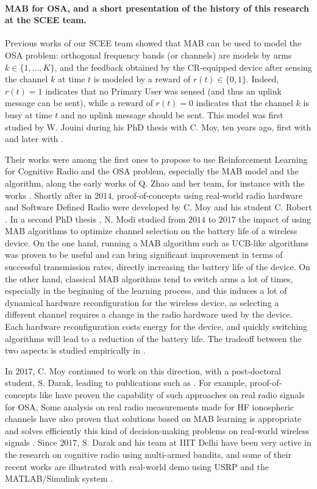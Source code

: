 \paragraph{MAB for OSA, and a short presentation of the history of this research at the SCEE team.}
%
Previous works of our SCEE team showed that MAB can be used to model the OSA problem:
orthogonal frequency bands (or channels) are models by arms $k\in\{1,\dots,K\}$,
and the feedback obtained by the CR-equipped device after sensing the channel $k$ at time $t$ is modeled by a reward of $r(t) \in \{0,1\}$.
Indeed, $r(t) = 1$ indicates that no Primary User was sensed (and thus an uplink message can be sent), while a reward of $r(t)=0$ indicates that the channel $k$ is busy at time $t$ and no uplink message should be sent.
%
This model was first studied by W. Jouini during his PhD thesis with C. Moy, ten years ago, first with \cite{Jouini09} and later with \cite{Jouini10,Jouini12}.

Their works were among the first ones to propose to use Reinforcement Learning for Cognitive Radio and the OSA problem, especially the MAB model and the \UCB{} algorithm,
along the early works of Q. Zhao and her team, for instance with the works \cite{Liu08,Zhao10}.
%
Shortly after in $2014$, proof-of-concepts using real-world radio hardware and Software Defined Radio were developed by C. Moy and his student C. Robert \cite{RobertSDR2014,MoyWSR2014}.
In a second PhD thesis \cite{Modi17PhD}, N. Modi studied from $2014$ to $2017$ the impact of using MAB algorithms to optimize channel selection on the battery life of a wireless device.
On the one hand, running a MAB algorithm such as UCB-like algorithms was proven to be useful and can bring significant improvement in terms of successful transmission rates, directly increasing the battery life of the device.
On the other hand, classical MAB algorithms tend to switch arms a lot of times, especially in the beginning of the learning process, and this induces a lot of dynamical hardware reconfiguration for the wireless device, as selecting a different channel requires a change in the radio hardware used by the device.
Each hardware reconfiguration costs energy for the device, and quickly switching algorithms will lead to a reduction of the battery life.
The tradeoff between the two aspects is studied empirically in
\cite{modiDemo2016}.

In $2017$, C. Moy continued to work on this direction, with a post-doctoral student, S. Darak, leading to publications such as
\cite{darak2016bayesian,Darak16}.
%
For example, proof-of-concepts like \cite{kumar2016two} have proven the capability of such approaches on real radio signals for OSA,
%
Some analysis on real radio measurements made for HF ionospheric channels have also proven that solutions based on MAB learning is appropriate and solves efficiently this kind of decision-making problems on real-world wireless signals \cite{Melian15}.
%
Since $2017$, S. Darak and his team at IIIT Delhi have been very active in the research on cognitive radio using multi-armed bandits, and some of their recent works are illustrated with real-world demo using USRP and the MATLAB/Simulink system
\cite{KumarYadav2018,SawantKumar2018,JoshiKumar2018}.

